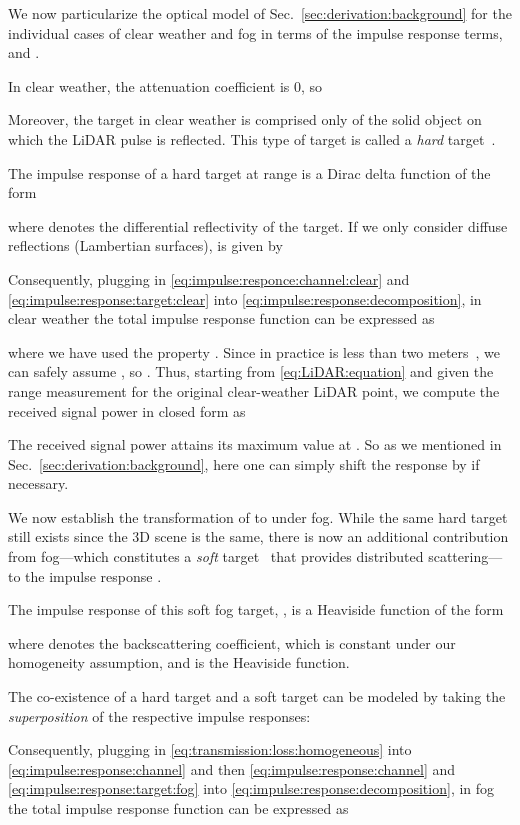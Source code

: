 \documentclass[10pt,twocolumn,letterpaper]{article}
\begin{document}
We now particularize the optical model of Sec.~\ref{sec:derivation:background} for the individual cases of clear weather and fog in terms of the impulse response terms,  and .

In clear weather, the attenuation coefficient  is 0, so

Moreover, the target in clear weather is comprised only of the solid object on which the LiDAR pulse is reflected. This type of target is called a \emph{hard} target~\cite{Rasshofer_2011}. 

The impulse response  of a hard target at range  is a Dirac delta function of the form

where  denotes the differential reflectivity of the target. If we only consider diffuse reflections (Lambertian surfaces),  is given by 


Consequently, plugging in \eqref{eq:impulse:responce:channel:clear} and \eqref{eq:impulse:response:target:clear} into \eqref{eq:impulse:response:decomposition}, in clear weather the total impulse response function  can be expressed as

where we have used the property . Since in practice  is less than two meters~\cite{Velodyne}, we can safely assume , so . Thus, starting from \eqref{eq:LiDAR:equation} and given the range measurement  for the original clear-weather LiDAR point, we compute the received signal power in closed form as

{\scriptsize

}The received signal power attains its maximum value at . So as we mentioned in Sec.~\ref{sec:derivation:background}, here one can simply shift the response  by  if necessary.

We now establish the transformation of  to  under fog. While the same hard target still exists since the 3D scene is the same, there is now an additional contribution from fog---which constitutes a \emph{soft} target~\cite{Rasshofer_2011} that provides distributed scattering---to the impulse response . 

The impulse response of this soft fog target, , is a Heaviside function of the form

where  denotes the backscattering coefficient, which is constant under our homogeneity assumption, and  is the Heaviside function. 

The co-existence of a hard target and a soft target can be modeled by taking the \emph{superposition} of the respective impulse responses:


Consequently, plugging in \eqref{eq:transmission:loss:homogeneous} into \eqref{eq:impulse:response:channel} and then \eqref{eq:impulse:response:channel} and  \eqref{eq:impulse:response:target:fog} into \eqref{eq:impulse:response:decomposition}, in fog the total impulse response function  can be expressed as
\end{document}
